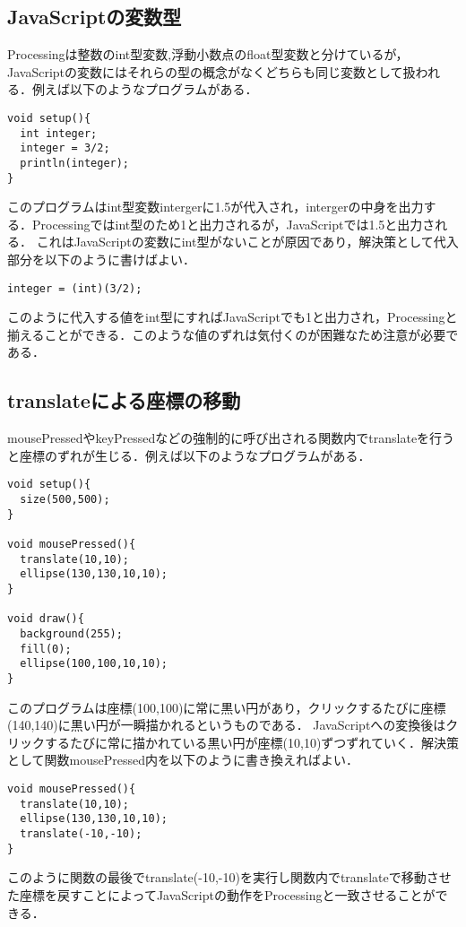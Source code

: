 \subsection{JavaScriptの変数型}
Processingは整数のint型変数,浮動小数点のfloat型変数と分けているが，JavaScriptの変数にはそれらの型の概念がなくどちらも同じ変数として扱われる．例えば以下のようなプログラムがある．
\begin{screen}
{\small
\begin{verbatim}
void setup(){
  int integer;
  integer = 3/2;
  println(integer); 
}
\end{verbatim}}
\end{screen}
このプログラムはint型変数intergerに1.5が代入され，intergerの中身を出力する．Processingではint型のため1と出力されるが，JavaScriptでは1.5と出力される．
これはJavaScriptの変数にint型がないことが原因であり，解決策として代入部分を以下のように書けばよい．
\begin{screen}
{\small
\begin{verbatim}
integer = (int)(3/2);
\end{verbatim}}
\end{screen}
このように代入する値をint型にすればJavaScriptでも1と出力され，Processingと揃えることができる．このような値のずれは気付くのが困難なため注意が必要である．

\subsection{translateによる座標の移動}
mousePressedやkeyPressedなどの強制的に呼び出される関数内でtranslateを行うと座標のずれが生じる．例えば以下のようなプログラムがある．

\begin{screen}
{\small
\begin{verbatim}
void setup(){
  size(500,500);
}

void mousePressed(){
  translate(10,10);
  ellipse(130,130,10,10);
}

void draw(){
  background(255);
  fill(0);
  ellipse(100,100,10,10);
}
\end{verbatim}}
\end{screen}
このプログラムは座標(100,100)に常に黒い円があり，クリックするたびに座標(140,140)に黒い円が一瞬描かれるというものである．
JavaScriptへの変換後はクリックするたびに常に描かれている黒い円が座標(10,10)ずつずれていく．解決策として関数mousePressed内を以下のように書き換えればよい．
\begin{screen}
{\small
\begin{verbatim}
void mousePressed(){
  translate(10,10);
  ellipse(130,130,10,10);
  translate(-10,-10);
}
\end{verbatim}}
\end{screen}
このように関数の最後でtranslate(-10,-10)を実行し関数内でtranslateで移動させた座標を戻すことによってJavaScriptの動作をProcessingと一致させることができる．














